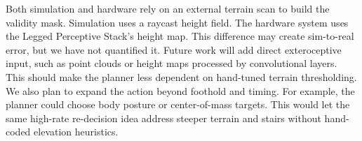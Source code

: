 Both simulation and hardware rely on an external terrain scan to build
the validity mask. Simulation uses a raycast height field. The
hardware system uses the Legged Perceptive Stack's height map. This
difference may create sim-to-real error, but we have not quantified
it. Future work will add direct exteroceptive input, such as point
clouds or height maps processed by convolutional layers. This should
make the planner less dependent on hand-tuned terrain thresholding. We
also plan to expand the action beyond foothold and timing. For
example, the planner could choose body posture or center-of-mass
targets. This would let the same high-rate re-decision idea address
steeper terrain and stairs without hand-coded elevation heuristics.
